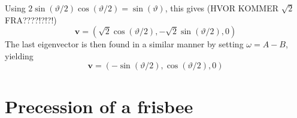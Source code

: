 \documentclass{article}
\begin{document}
        Using $2\sin(\vartheta/2) \cos(\vartheta/2) = \sin(\vartheta)$, this gives (HVOR KOMMER $\sqrt 2$ FRA????!?!?!)
        \begin{equation*}
            \mathbf{v} = \left( \sqrt 2 \cos(\vartheta/2), -\sqrt 2 \sin(\vartheta / 2), 0 \right)
        \end{equation*}
        The last eigenvector is then found in a similar manner by setting $\omega = A - B$, yielding
        \begin{equation*}
            \mathbf{v} = \left(-\sin(\vartheta/2), \cos(\vartheta/2), 0\right)
        \end{equation*}

    \section{Precession of a frisbee}
\end{document}
